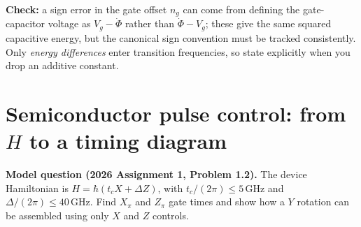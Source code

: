 \begin{examtip}
\textbf{Check:} a sign error in the gate offset $n_g$ can come from defining the gate-capacitor voltage as $V_g-\dot\Phi$ rather than $\dot\Phi-V_g$; these give the same squared capacitive energy, but the canonical sign convention must be tracked consistently. Only \emph{energy differences} enter transition frequencies, so state explicitly when you drop an additive constant.
\end{examtip}

\section{Semiconductor pulse control: from $H$ to a timing diagram}\label{sec:pulses}
\textbf{Model question (2026 Assignment 1, Problem 1.2).} The device Hamiltonian is $H=\hbar(t_cX+\Delta Z)$, with $t_c/(2\pi)\le5\,\mathrm{GHz}$ and $\Delta/(2\pi)\le40\,\mathrm{GHz}$. Find $X_\pi$ and $Z_\pi$ gate times and show how a $Y$ rotation can be assembled using only $X$ and $Z$ controls.

